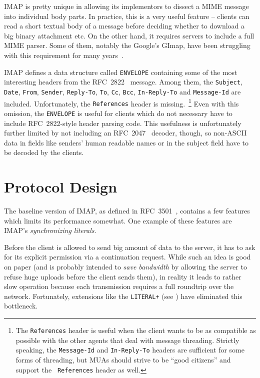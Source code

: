 \documentclass[trojita]{subfiles}
\begin{document}
IMAP is pretty unique in allowing its implementors to dissect a MIME message~\cite{rfc2045} into individual body parts.
In practice, this is a very useful feature -- clients can read a short textual body of a message before deciding whether
to download a big binary attachment etc.  On the other hand, it requires servers to include a full MIME parser.  Some of
them, notably the Google's GImap, have been struggling with this requirement for many
years~\cite{gmail-bodystructure-sucks}.

IMAP defines a data structure called {\tt ENVELOPE} containing some of the most interesting headers from the
RFC~2822~\cite{rfc2822} message.  Among them, the {\tt Subject}, {\tt Date}, {\tt From}, {\tt Sender}, {\tt Reply-To},
{\tt To}, {\tt Cc}, {\tt Bcc}, {\tt In-Reply-To} and {\tt Message-Id} are included.  Unfortunately, the {\tt References}
header is missing.~\footnote{The {\tt References} header is useful when the client wants to be as compatible as possible
with the other agents that deal with message threading.  Strictly speaking, the {\tt Message-Id} and {\tt In-Reply-To}
headers are sufficient for some forms of threading, but MUAs should strive to be ``good citizens'' and support the {\tt
References} header as well.}  Even with this omission, the {\tt ENVELOPE} is useful for clients which do not necessary
have to include RFC~2822-style header parsing code.  This usefulness is unfortunately further limited by not including
an RFC~2047~\cite{rfc2047} decoder, though, so non-ASCII data in fields like senders' human readable names or in the
subject field have to be decoded by the clients.

\section{Protocol Design}

The baseline version of IMAP, as defined in RFC~3501~\cite{rfc3501}, contains a few features which limits its
performance somewhat.  One example of these features are IMAP's {\em synchronizing literals}.

Before the client is allowed to send big amount of data to the server, it has to ask for its explicit permission via a
continuation request.  While such an idea is good on paper (and is probably intended to {\em save bandwidth} by allowing
the server to refuse huge uploads before the client sends them), in reality it leads to rather slow operation because
each transmission requires a full roundtrip over the network.  Fortunately, extensions like the {\tt LITERAL+} (see
) have eliminated this bottleneck.
\end{document}
